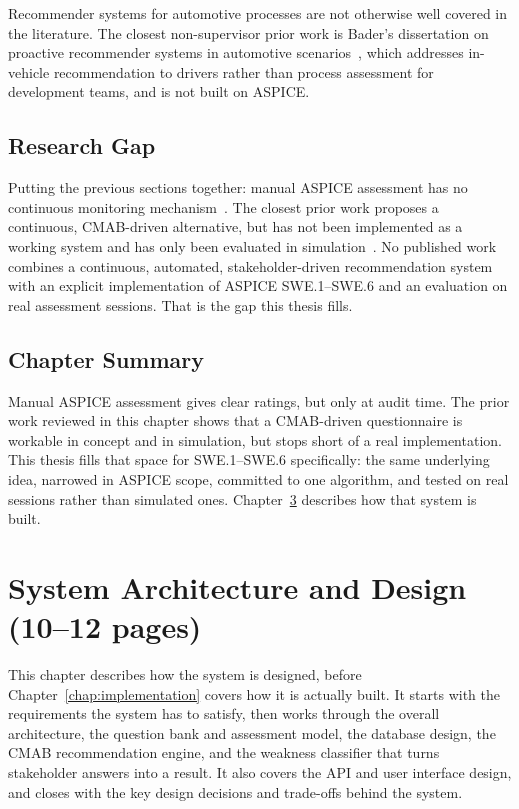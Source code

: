 \documentclass[a4paper, 12pt, oneside, openany, BCOR1cm,toc=chapterentrywithdots]{scrbook}
\begin{document}
Recommender systems for automotive processes are not otherwise well covered in the literature.
The closest non-supervisor prior work is Bader's dissertation on proactive recommender systems in
automotive scenarios~\cite{bader2013proactive}, which addresses in-vehicle recommendation to
drivers rather than process assessment for development teams, and is not built on ASPICE.

\section{Research Gap}

Putting the previous sections together: manual ASPICE assessment has no continuous monitoring
mechanism~\cite{datsogiannis2024early}. The closest prior work proposes a continuous, CMAB-driven
alternative, but has not been implemented as a working system and has only been evaluated in
simulation~\cite{datsogiannis2024early,datsogiannis2025recommender}. No published work combines a
continuous, automated, stakeholder-driven recommendation system with an explicit implementation
of ASPICE SWE.1--SWE.6 and an evaluation on real assessment sessions. That is the gap this thesis
fills.

\section{Chapter Summary}

Manual ASPICE assessment gives clear ratings, but only at audit time. The prior work reviewed in
this chapter shows that a CMAB-driven questionnaire is workable in concept and in simulation, but
stops short of a real implementation. This thesis fills that space for SWE.1--SWE.6 specifically:
the same underlying idea, narrowed in ASPICE scope, committed to one algorithm, and tested on real
sessions rather than simulated ones. Chapter~\ref{chap:architecture} describes how that system is
built.

\chapter{System Architecture and Design (10--12 pages)}
\label{chap:architecture}
% 

This chapter describes how the system is designed, before Chapter~\ref{chap:implementation}
covers how it is actually built. It starts with the requirements the system has to satisfy, then
works through the overall architecture, the question bank and assessment model, the database
design, the CMAB recommendation engine, and the weakness classifier that turns stakeholder
answers into a result. It also covers the API and user interface design, and closes with the key
design decisions and trade-offs behind the system.
\end{document}
